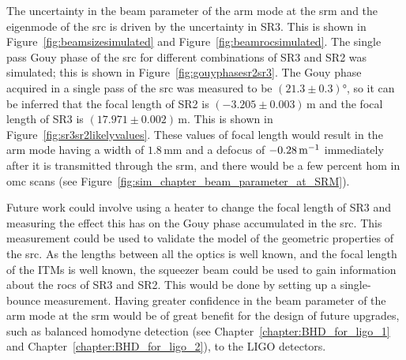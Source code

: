 \par
The uncertainty in the beam parameter of the arm mode at the \gls{srm} and the eigenmode of the \gls{src} is driven by the uncertainty in SR3. This is shown in Figure~\ref{fig:beamsizesimulated} and Figure~\ref{fig:beamrocsimulated}. The single pass Gouy phase of the \gls{src} for different combinations of SR3 and SR2 was simulated; this is shown in Figure~\ref{fig:gouyphasesr2sr3}. The Gouy phase acquired in a single pass of the \gls{src} was measured to be $(21.3\pm0.3)\si{\degree}$, so it can be inferred that the focal length of SR2 is $(-3.205\pm0.003)$\,m and the focal length of SR3 is $(17.971\pm0.002)$\,m. This is shown in Figure~\ref{fig:sr3sr2likelyvalues}. These values of focal length would result in the arm mode having a width of $1.8$\,mm and a defocus of $-0.28\,\rm{m}^{-1}$ immediately after it is transmitted through the \gls{srm}, and there would be a few percent \gls{hom} in \gls{omc} scans (see Figure~\ref{fig:sim_chapter_beam_parameter_at_SRM}).
\par
Future work could involve using a heater to change the focal length of SR3 and measuring the effect this has on the Gouy phase accumulated in the \gls{src}. This measurement could be used to validate the model of the geometric properties of the \gls{src}. As the lengths between all the optics is well known, and the focal length of the ITMs is well known, the squeezer beam could be used to gain information about the \glspl{roc} of SR3 and SR2. This would be done by setting up a single-bounce measurement. Having greater confidence in the beam parameter of the arm mode at the \gls{srm} would be of great benefit for the design of future upgrades, such as balanced homodyne detection (see Chapter~\ref{chapter:BHD_for_ligo_1} and Chapter~\ref{chapter:BHD_for_ligo_2}), to the LIGO detectors.
